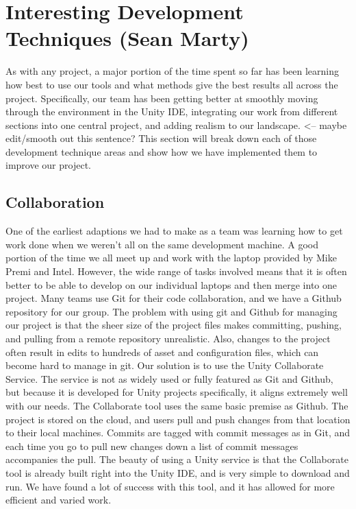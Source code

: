 \documentclass[10pt,journal,compsoc,onecolumn, draftclsnofoot]{IEEEtran}
\begin{document}
\section{Interesting Development Techniques (Sean Marty)}
As with any project, a major portion of the time spent so far has been learning how best to use our tools and what methods give the best results all across the project.
Specifically, our team has been getting better at smoothly moving through the environment in the Unity IDE, integrating our work from different sections into one central project, and adding realism to our landscape.  <-- maybe edit/smooth out this sentence?
This section will break down each of those development technique areas and show how we have implemented them to improve our project.

\subsection{Collaboration}
One of the earliest adaptions we had to make as a team was learning how to get work done when we weren't all on the same development machine.
A good portion of the time we all meet up and work with the laptop provided by Mike Premi and Intel.
However, the wide range of tasks involved means that it is often better to be able to develop on our individual laptops and then merge into one project.
Many teams use Git for their code collaboration, and we have a Github repository for our group.
The problem with using git and Github for managing our project is that the sheer size of the project files makes committing, pushing, and pulling from a remote repository unrealistic.
Also, changes to the project often result in edits to hundreds of asset and configuration files, which can become hard to manage in git.
Our solution is to use the Unity Collaborate Service.
The service is not as widely used or fully featured as Git and Github, but because it is developed for Unity projects specifically, it aligns extremely well with our needs.
The Collaborate tool uses the same basic premise as Github.
The project is stored on the cloud, and users pull and push changes from that location to their local machines.
Commits are tagged with commit messages as in Git, and each time you go to pull new changes down a list of commit messages accompanies the pull.
The beauty of using a Unity service is that the Collaborate tool is already built right into the Unity IDE, and is very simple to download and run.
We have found a lot of success with this tool, and it has allowed for more efficient and varied work.
\end{document}

